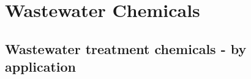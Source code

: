 
\chapter{Wastewater Chemicals}

\section{Wastewater treatment chemicals - by application}

\setlength{\arrayrulewidth}{0.1mm}
\setlength{\tabcolsep}{8 pt}
\renewcommand{\arraystretch}{0.8}
\begin{tabular}{ |p{5.5cm}|p{4.5cm}|p{5cm}|  }
\hline


\end{tabular}
